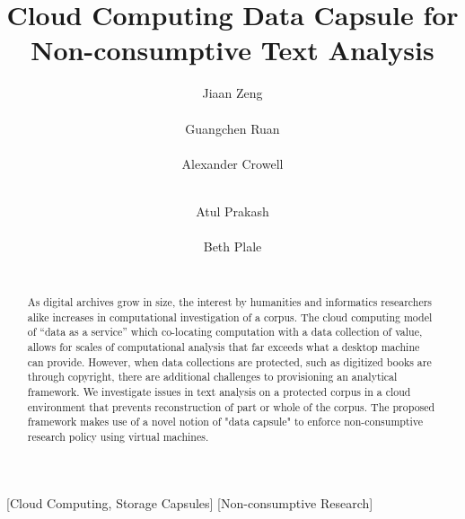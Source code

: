 \documentclass{acm_proc_article-sp}
\begin{document}
\title{Cloud Computing Data Capsule for Non-consumptive Text Analysis}

\author{
\alignauthor
Jiaan Zeng \\
       \\
\alignauthor
Guangchen Ruan \\
       \\
\alignauthor 
Alexander Crowell \\
       \\
\and  %
\alignauthor 
Atul Prakash \\
       \\
\alignauthor Beth Plale \\
       \\
}

\maketitle
\begin{abstract}
As digital archives grow in size, the interest by humanities and informatics
researchers alike increases in computational investigation of a corpus.  The
cloud computing model of ``data as a service'' which co-locating computation with
a data collection of value, allows for scales of computational analysis that
far exceeds what a desktop machine can provide. However, when data collections
are protected, such as digitized books are through copyright, there are
additional challenges to provisioning an analytical framework. We investigate
issues in text analysis on a protected corpus in a cloud environment that
prevents reconstruction of part or whole of the corpus.  The proposed framework
makes use of a novel notion of "data capsule" to enforce non-consumptive
research policy using virtual machines.
\end{abstract}


[Cloud Computing, Storage Capsules]
[Non-consumptive Research]
\end{document}
